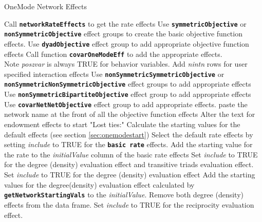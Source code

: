 \documentclass[12pt,a4paper]{article}
\makeatletter
\renewcommand{\=}{\,=\,}
\newcommand{\+}{\,+\,}
\newcommand{\nnm}[1]{\textsf{\small\textit{#1}}}
\renewcommand{\subsection}{\@startsection{subsection}{2}
                {0pt}{0.7\baselineskip}{0.3\baselineskip}
                {\sffamily} }
\newcommand{\sfn}[1]{\textbf{\texttt{#1}}}
\makeatother
\begin{document}
\subsection{OneMode Network Effects}
\begin{algorithmic}
  \STATE Call \sfn{networkRateEffects} to get the rate effects
  \STATE Use \sfn{symmetricObjective} or \sfn{nonSymmetricObjective} effect
  groups to create the basic objective function effects.
  \STATE Use \sfn{dyadObjective} effect group to add appropriate objective
  function effects
  \ENDFOR
  \STATE Call function \sfn{covarOneModeEff} to add the appropriate effects.\\
  Note \nnm{poszvar} is always TRUE for behavior variables.
  \ENDFOR
  \STATE Add \nnm{nintn} rows for user specified interaction effects
  \ENDIF
  \STATE Use \sfn{nonSymmetricSymmetricObjective} or
  \sfn{nonSymmetricNonSymmetricObjective} effect groups to add appropriate
effects
  \STATE Use \sfn{nonSymmetricBipartiteObjective} effect group to add
  appropriate effects
  \ENDIF
  \STATE Use \sfn{covarNetNetObjective} effect group to add appropriate effects.
  \ENDFOR
  \ENDFOR
  \STATE paste the network name at the front of all the objective function
  effects
  \ENDIF
  \STATE Alter the text for endowment effects to start "Lost ties:"
  \STATE Calculate the starting values for the default effects
  (see section \ref{sec:onemodestart})
  \STATE Select the default rate effects by setting \nnm{include} to TRUE for
  the \sfn{basic rate} effects.
  \STATE Add the starting value for the rate to the \nnm{initialValue} column
  of the basic rate effects
  \STATE Set \nnm{include} to TRUE for the degree (density) evaluation effect
  and transitive triads evaluation effect.
  \ELSE
  \STATE  Set \nnm{include} to TRUE for the degree (density) evaluation effect
  \STATE Add the starting values for the degree(density) evaluation effect
  calculated by \sfn{getNetworkStartingVals} to the \nnm{initialValue}.
  \ELSE
  \STATE Remove both degree (density) effects from the data frame.
  \ENDIF
  \STATE Set \nnm{include} to TRUE for the reciprocity evaluation effect.
  \ENDIF
\end{algorithmic}
\end{document}
